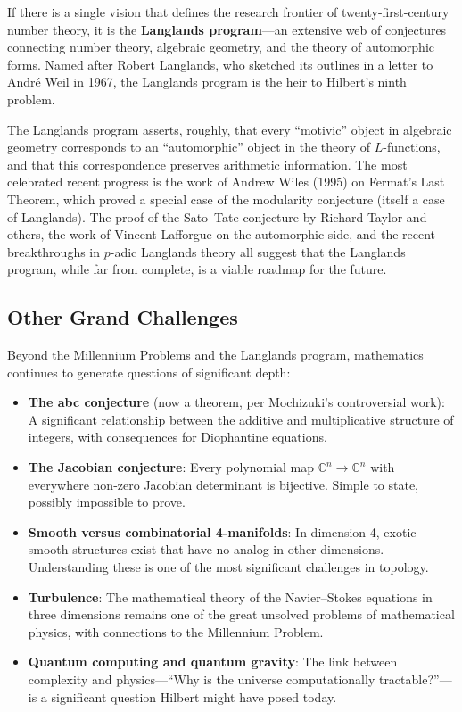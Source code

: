 If there is a single vision that defines the research frontier of twenty-first-century number theory, it is the \textbf{Langlands program}---an extensive web of conjectures connecting number theory, algebraic geometry, and the theory of automorphic forms. Named after Robert Langlands, who sketched its outlines in a letter to Andr\'e Weil in 1967, the Langlands program is the heir to Hilbert's ninth problem.

The Langlands program asserts, roughly, that every ``motivic'' object in algebraic geometry corresponds to an ``automorphic'' object in the theory of $L$-functions, and that this correspondence preserves arithmetic information. The most celebrated recent progress is the work of Andrew Wiles (1995) on Fermat's Last Theorem, which proved a special case of the modularity conjecture (itself a case of Langlands). The proof of the Sato--Tate conjecture by Richard Taylor and others, the work of Vincent Lafforgue on the automorphic side, and the recent breakthroughs in $p$-adic Langlands theory all suggest that the Langlands program, while far from complete, is a viable roadmap for the future.

\subsection{Other Grand Challenges}

Beyond the Millennium Problems and the Langlands program, mathematics continues to generate questions of significant depth:

\begin{itemize}
    \item \textbf{The abc conjecture} (now a theorem, per Mochizuki's controversial work): A significant relationship between the additive and multiplicative structure of integers, with consequences for Diophantine equations.
    \item \textbf{The Jacobian conjecture}: Every polynomial map $\mathbb{C}^n \to \mathbb{C}^n$ with everywhere non-zero Jacobian determinant is bijective. Simple to state, possibly impossible to prove.
    \item \textbf{Smooth versus combinatorial 4-manifolds}: In dimension 4, exotic smooth structures exist that have no analog in other dimensions. Understanding these is one of the most significant challenges in topology.
    \item \textbf{Turbulence}: The mathematical theory of the Navier--Stokes equations in three dimensions remains one of the great unsolved problems of mathematical physics, with connections to the Millennium Problem.
    \item \textbf{Quantum computing and quantum gravity}: The link between complexity and physics---``Why is the universe computationally tractable?''---is a significant question Hilbert might have posed today.
\end{itemize}

